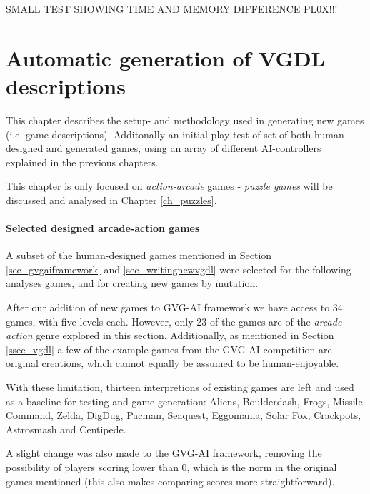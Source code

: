 \documentclass[a4paper,titlepage,final]{report}
\begin{document}
SMALL TEST SHOWING TIME AND MEMORY DIFFERENCE PL0X!!!

 



\chapter{Automatic generation of VGDL descriptions}
\label{ch_task1autogenofvgdl}
This chapter describes the setup- and methodology used in generating new games (i.e. game descriptions).
Additonally an initial play test of set of both human-designed and generated games, using an array of different AI-controllers explained in the previous chapters.

This chapter is only focused on \textit{action-arcade} games - \textit{puzzle games} will be discussed and analysed in Chapter \ref{ch_puzzles}.

\subsubsection*{Selected designed arcade-action games}
A subset of the human-designed games mentioned in Section \ref{sec_gvgaiframework} and \ref{sec_writingnewvgdl} were selected for the following analyses games, and for creating new games by mutation.

After our addition of new games to GVG-AI framework we have access to 34 games, with five levels each. 
However, only 23 of the games are of the \textit{arcade-action} genre explored in this section. 
Additionally, as mentioned in Section \ref{ssec_vgdl} a few of the example games from the GVG-AI competition are original creations, which cannot equally be assumed to be human-enjoyable.

With these limitation, thirteen interpretions of existing games are left and used as a baseline for testing and game generation: Aliens, Boulderdash, Frogs, Missile Command, Zelda, DigDug, Pacman, Seaquest, Eggomania, Solar Fox, Crackpots, Astrosmash and Centipede.

A slight change was also made to the GVG-AI framework, removing the possibility of players scoring lower than 0, which is the norm in the original games mentioned (this also makes comparing scores more straightforward).
\end{document}

